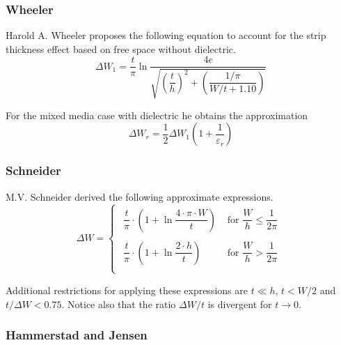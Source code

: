 \subsubsection{Wheeler}

Harold A. Wheeler \cite{Wheeler} proposes the following equation to
account for the strip thickness effect based on free space without
dielectric.
\begin{equation}
\Delta W_1 = \dfrac{t}{\pi} \ln{\dfrac{4 e}{\sqrt{\left(\dfrac{t}{h}\right)^2 + \left(\dfrac{1/\pi}{W/t + 1.10}\right)}}}
\end{equation}

For the mixed media case with dielectric he obtains the approximation
\begin{equation}
\Delta W_r = \dfrac{1}{2} \Delta W_1 \left(1 + \dfrac{1}{\varepsilon_r}\right)
\end{equation}

\subsubsection{Schneider}

M.V. Schneider \cite{Schneider} derived the following approximate
expressions.
\begin{equation}
\Delta W =
\begin{cases}
\begin{array}{ll}
\dfrac{t}{\pi}\cdot\left(1 + \ln{\dfrac{4\cdot\pi\cdot W}{t}}\right) & \textrm{ for } \dfrac{W}{h} \le \dfrac{1}{2\pi}\\
&\\
\dfrac{t}{\pi}\cdot\left(1 + \ln{\dfrac{2\cdot h}{t}}\right) & \textrm{ for } \dfrac{W}{h} > \dfrac{1}{2\pi}\\
\end{array}
\end{cases}
\end{equation}

Additional restrictions for applying these expressions are $t \ll h$,
$t < W/2$ and $t/\Delta W < 0.75$.  Notice also that the ratio $\Delta
W / t$ is divergent for $t \rightarrow 0$.

\subsubsection{Hammerstad and Jensen}

